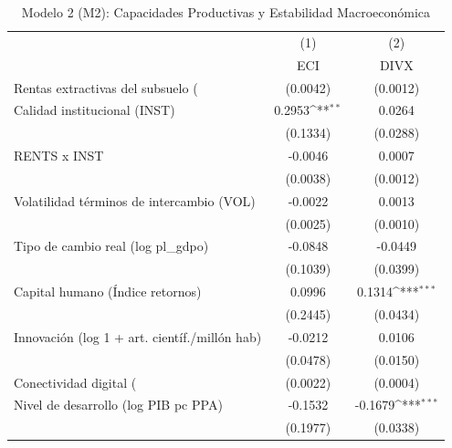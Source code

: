 \begin{table}[htbp]\centering
\def\sym#1{\ifmmode^{#1}\else\(^{#1}\)\fi}
\caption{Modelo 2 (M2): Capacidades Productivas y Estabilidad Macroeconómica}
\begin{tabular}{l*{2}{c}}
\toprule
                    &\multicolumn{1}{c}{(1)}&\multicolumn{1}{c}{(2)}\\
                    &\multicolumn{1}{c}{ECI}&\multicolumn{1}{c}{DIVX}\\
\midrule
Rentas extractivas del subsuelo (%
                    &    (0.0042)         &    (0.0012)         \\
\addlinespace
Calidad institucional (INST)&      0.2953\sym{**} &      0.0264         \\
                    &    (0.1334)         &    (0.0288)         \\
\addlinespace
RENTS x INST        &     -0.0046         &      0.0007         \\
                    &    (0.0038)         &    (0.0012)         \\
\addlinespace
Volatilidad términos de intercambio (VOL)&     -0.0022         &      0.0013         \\
                    &    (0.0025)         &    (0.0010)         \\
\addlinespace
Tipo de cambio real (log pl\_gdpo)&     -0.0848         &     -0.0449         \\
                    &    (0.1039)         &    (0.0399)         \\
\addlinespace
Capital humano (Índice retornos)&      0.0996         &      0.1314\sym{***}\\
                    &    (0.2445)         &    (0.0434)         \\
\addlinespace
Innovación (log 1 + art. científ./millón hab)&     -0.0212         &      0.0106         \\
                    &    (0.0478)         &    (0.0150)         \\
\addlinespace
Conectividad digital (%
                    &    (0.0022)         &    (0.0004)         \\
\addlinespace
Nivel de desarrollo (log PIB pc PPA)&     -0.1532         &     -0.1679\sym{***}\\
                    &    (0.1977)         &    (0.0338)         \\

\end{tabular}
\end{table}
